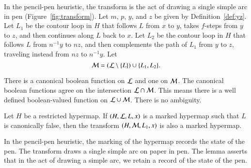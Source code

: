 \figKCSQIOY %

In the pencil-pen heuristic, the transform is the act of drawing a single simple arc in
pen (Figure~\ref{fig:transform}).
Let $m$, $p$, $y$, and $z$ be  given by
Definition~\ref{def:yz}.
Let $L_1$ be 
the contour loop in $H$ that follows $L$ from $x$ to $y$,  takes
$f$-steps from $y$ to $z$, and then continues along $L$ back to $x$.  
Let $L_2$ be
the contour loop in $H$ that follows $L$ from $n^{-1} y$ to $n z$, and
then complements the path of $L_1$ from $y$ to $z$, traveling instead
from $n z$ to $n^{-1} y$. 
Let
\begin{equation}\label{eqn:ML} 
{\cal M} = ({\cal L}\setminus \{L\}) \cup\{L_1,L_2\}.
\end{equation}

\begin{remark}
There is a canonical boolean function on ${\cal L}$ and one on ${\cal M}$.
The canonical boolean functions agree on the intersection ${\cal L}\cap {\cal M}$.
This means there is a well defined boolean-valued function on 
${\cal L}\cup {\cal M}$.  There is no ambiguity.  
\end{remark}




\begin{lemma}\label{lemma:flag} 
Let $H$ be a restricted hypermap.
If $(H,{\cal L},L,x)$ is a marked hypermap such that $L$
is canonically false,  then the transform
$(H,{\cal M},L_1,x)$ 
is also a marked hypermap.
\end{lemma}

In the pencil-pen heuristic, the marking of the hypermap records the
state of the pen.  The transform draws a single simple arc on paper in
pen.  The lemma asserts that in the act of drawing a simple arc, we
retain a record of the state of the pen.

